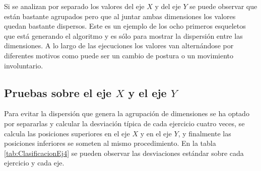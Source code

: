 Si se analizan por separado los valores del eje $X$ y del eje $Y$ se puede observar que están bastante agrupados pero que al juntar ambas dimensiones los valores quedan bastante dispersos. Este es un ejemplo de los ocho primeros esqueletos que está generando el algoritmo y es sólo para mostrar la dispersión entre las dimensiones. A lo largo de las ejecuciones los valores van alternándose por diferentes motivos como puede ser un cambio de postura o un movimiento involuntario. 

\subsection{Pruebas sobre el eje $X$ y el eje $Y$}

Para evitar la dispersión que genera la agrupación de dimensiones se ha optado por separarlas y calcular la desviación típica de cada ejercicio cuatro veces, se calcula las posiciones superiores en el eje $X$ y en el eje $Y$, y finalmente las posiciones inferiores se someten al mismo procedimiento. En la tabla \ref{tab:ClasificacionEj4} se pueden observar las desviaciones estándar sobre cada ejercicio y cada eje. 

